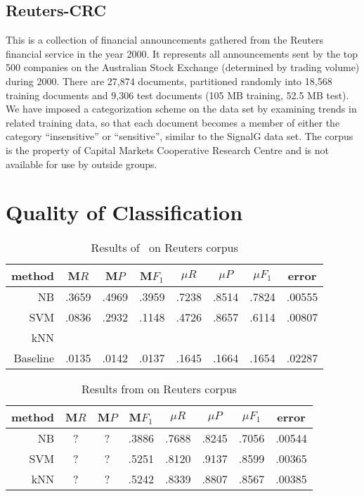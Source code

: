 \subsection{Reuters-CRC}
This is a collection of financial announcements gathered from the
Reuters financial service in the year 2000.  It represents all
announcements sent by the top 500 companies on the Australian Stock
Exchange (determined by trading volume) during 2000.  There are 27,874
documents, partitioned randomly into 18,568 training documents and
9,306 test documents (105 MB training, 52.5 MB test).  We have imposed
a categorization scheme on the data set by examining trends in related
training data, so that each document becomes a member of either the
category ``insensitive'' or ``sensitive'', similar to the SignalG data
set.  The corpus is the property of Capital Markets Cooperative
Research Centre and is not available for use by outside groups.


\section{Quality of Classification}

\begin{table}
\begin{tabular}{|r c c c c c c c|}
\hline
method & M$R$ & M$P$ & M$F_1$ & $\mu R$ & $\mu P$ & $\mu F_1$ & error \\
\hline
NB       & .3659 & .4969 & .3959 & .7238 & .8514 & .7824 & .00555 \\
SVM      & .0836 & .2932 & .1148 & .4726 & .8657 & .6114 & .00807 \\
kNN      & \\
Baseline & .0135 & .0142 & .0137 & .1645 & .1664 & .1654 & .02287 \\
\hline
\end{tabular}
\caption{Results of \aicat\ on Reuters corpus}
\end{table}

\begin{table}
\begin{tabular}{|r c c c c c c c|}
\hline
method & M$R$ & M$P$ & M$F_1$ & $\mu R$ & $\mu P$ & $\mu F_1$ & error \\
\hline
NB  & ? & ? & .3886 & .7688 & .8245 & .7056 & .00544 \\
SVM & ? & ? & .5251 & .8120 & .9137 & .8599 & .00365 \\
kNN & ? & ? & .5242 & .8339 & .8807 & .8567 & .00385 \\
\hline
\end{tabular}
\caption{Results from \cite{yang:99} on Reuters corpus}
\end{table}


